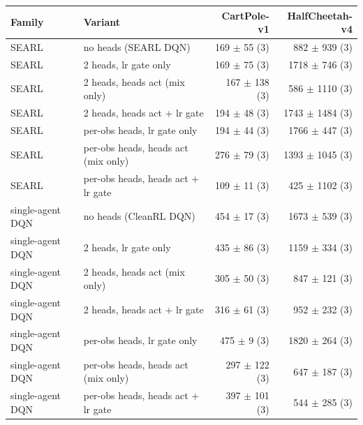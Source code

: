 \begin{tabular}{llrr}
\toprule
Family & Variant & CartPole-v1 & HalfCheetah-v4 \\
\midrule
SEARL & no heads (SEARL DQN) & 169 $\pm$ 55 (3) & 882 $\pm$ 939 (3) \\
SEARL & 2 heads, lr gate only & 169 $\pm$ 75 (3) & 1718 $\pm$ 746 (3) \\
SEARL & 2 heads, heads act (mix only) & 167 $\pm$ 138 (3) & 586 $\pm$ 1110 (3) \\
SEARL & 2 heads, heads act + lr gate & 194 $\pm$ 48 (3) & 1743 $\pm$ 1484 (3) \\
SEARL & per-obs heads, lr gate only & 194 $\pm$ 44 (3) & 1766 $\pm$ 447 (3) \\
SEARL & per-obs heads, heads act (mix only) & 276 $\pm$ 79 (3) & 1393 $\pm$ 1045 (3) \\
SEARL & per-obs heads, heads act + lr gate & 109 $\pm$ 11 (3) & 425 $\pm$ 1102 (3) \\
\midrule
single-agent DQN & no heads (CleanRL DQN) & 454 $\pm$ 17 (3) & 1673 $\pm$ 539 (3) \\
single-agent DQN & 2 heads, lr gate only & 435 $\pm$ 86 (3) & 1159 $\pm$ 334 (3) \\
single-agent DQN & 2 heads, heads act (mix only) & 305 $\pm$ 50 (3) & 847 $\pm$ 121 (3) \\
single-agent DQN & 2 heads, heads act + lr gate & 316 $\pm$ 61 (3) & 952 $\pm$ 232 (3) \\
single-agent DQN & per-obs heads, lr gate only & 475 $\pm$ 9 (3) & 1820 $\pm$ 264 (3) \\
single-agent DQN & per-obs heads, heads act (mix only) & 297 $\pm$ 122 (3) & 647 $\pm$ 187 (3) \\
single-agent DQN & per-obs heads, heads act + lr gate & 397 $\pm$ 101 (3) & 544 $\pm$ 285 (3) \\
\bottomrule
\end{tabular}
